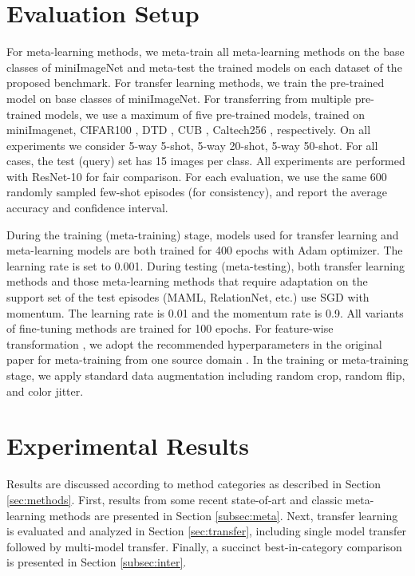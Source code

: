 \documentclass[runningheads]{llncs}
\begin{document}
\section{Evaluation Setup}
\label{sec:setup}
For meta-learning methods, we meta-train all meta-learning methods on the base classes of miniImageNet \cite{vinyals2016matching} and meta-test the trained models on each dataset of the proposed benchmark. For transfer learning methods, we train the pre-trained model on base classes of miniImageNet. For transferring from multiple pre-trained models, we use a maximum of five pre-trained models, trained on miniImagenet, CIFAR100 \cite{krizhevsky2009learning}, DTD \cite{cimpoi2014describing}, CUB \cite{WelinderEtal2010}, Caltech256 \cite{griffin2007caltech}, respectively. On all experiments we consider 5-way 5-shot, 5-way 20-shot, 5-way 50-shot. For all cases, the test (query) set has 15 images per class. All experiments are performed with ResNet-10 \cite{he2016deep} for fair comparison. For each evaluation, we use the same 600 randomly sampled few-shot episodes (for consistency), and report the average accuracy and  confidence interval.  

 During the training (meta-training) stage, models used for transfer learning and meta-learning models are both trained for 400 epochs with Adam optimizer. The learning rate is set to 0.001. During testing (meta-testing), both transfer learning methods and those meta-learning methods that require adaptation on the support set of the test episodes (MAML, RelationNet, etc.) use SGD with momentum. The learning rate is 0.01 and the momentum rate is 0.9. All variants of fine-tuning methods are trained for 100 epochs. For feature-wise transformation \cite{tsengcrossdomain}, we adopt the recommended hyperparameters in the original paper for meta-training from one source domain . In the training or meta-training stage, we apply standard data augmentation including random crop, random flip, and color jitter.


\section{Experimental Results}

Results are discussed according to method categories as described in Section \ref{sec:methods}. First, results from some recent state-of-art and classic meta-learning methods are presented in Section \ref{subsec:meta}. Next, transfer learning is evaluated and analyzed in Section \ref{sec:transfer}, including single model transfer followed by multi-model transfer. Finally, a succinct best-in-category comparison is presented in Section \ref{subsec:inter}. 
\end{document}
